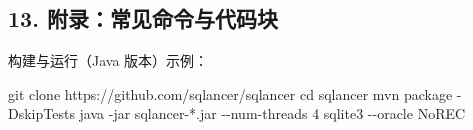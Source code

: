 \documentclass[
]{article}
\newenvironment{Shaded}{}{}
\newcommand{\AttributeTok}[1]{\textcolor[rgb]{0.49,0.56,0.16}{#1}}
\newcommand{\BuiltInTok}[1]{\textcolor[rgb]{0.00,0.50,0.00}{#1}}
\newcommand{\ExtensionTok}[1]{#1}
\newcommand{\FunctionTok}[1]{\textcolor[rgb]{0.02,0.16,0.49}{#1}}
\newcommand{\NormalTok}[1]{#1}
\newcommand{\PreprocessorTok}[1]{\textcolor[rgb]{0.74,0.48,0.00}{#1}}
\begin{document}
\subsection{13.
附录：常见命令与代码块}\label{ux9644ux5f55ux5e38ux89c1ux547dux4ee4ux4e0eux4ee3ux7801ux5757}

构建与运行（Java 版本）示例：

\begin{Shaded}
\begin{Highlighting}[]
\FunctionTok{git}\NormalTok{ clone https://github.com/sqlancer/sqlancer}
\BuiltInTok{cd}\NormalTok{ sqlancer}
\ExtensionTok{mvn}\NormalTok{ package }\AttributeTok{{-}DskipTests}
\ExtensionTok{java} \AttributeTok{{-}jar}\NormalTok{ sqlancer{-}}\PreprocessorTok{*}\NormalTok{.jar }\AttributeTok{{-}{-}num{-}threads}\NormalTok{ 4 sqlite3 }\AttributeTok{{-}{-}oracle}\NormalTok{ NoREC}
\end{Highlighting}
\end{Shaded}
\end{document}
